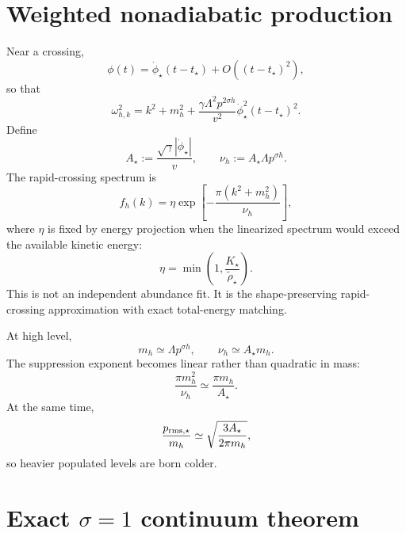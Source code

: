\section{Weighted nonadiabatic production}

Near a crossing,
\begin{equation}
 \phi(t)=\dot\phi_\star(t-t_\star)+O((t-t_\star)^2),
 \label{eq:scw-crossing-linearization}
\end{equation}
so that
\begin{equation}
 \omega_{h,k}^2
 =k^2+m_h^2
 +\frac{\gamma\Lambda^2p^{2\sigma h}}{v^2}
 \dot\phi_\star^2(t-t_\star)^2.
 \label{eq:scw-crossing-frequency}
\end{equation}
Define
\begin{equation}
 A_\star:=\frac{\sqrt\gamma|\dot\phi_\star|}{v},
 \qquad
 \nu_h:=A_\star\Lambda p^{\sigma h}.
 \label{eq:scw-weighted-rate}
\end{equation}
The rapid-crossing spectrum is
\begin{equation}
 \boxed{
 f_h(k)
 =\eta
 \exp\left[-\frac{\pi(k^2+m_h^2)}{\nu_h}\right],}
 \label{eq:scw-weighted-occupation}
\end{equation}
where $\eta$ is fixed by energy projection when the linearized spectrum would exceed the available kinetic energy:
\begin{equation}
 \eta
 =\min\left(1,\frac{K_\star}{\widetilde\rho_\star}\right).
 \label{eq:scw-energy-projection}
\end{equation}
This is not an independent abundance fit.  It is the shape-preserving rapid-crossing approximation with exact total-energy matching.

At high level,
\begin{equation}
 m_h\simeq\Lambda p^{\sigma h},
 \qquad
 \nu_h\simeq A_\star m_h.
 \label{eq:scw-high-level-law}
\end{equation}
The suppression exponent becomes linear rather than quadratic in mass:
\begin{equation}
 \frac{\pi m_h^2}{\nu_h}
 \simeq\frac{\pi m_h}{A_\star}.
 \label{eq:scw-linear-mass-suppression}
\end{equation}
At the same time,
\begin{equation}
 \frac{p_{\rm rms,\star}}{m_h}
 \simeq
 \sqrt{\frac{3A_\star}{2\pi m_h}},
 \label{eq:scw-heavy-colder}
\end{equation}
so heavier populated levels are born colder.

\section{Exact \texorpdfstring{$\sigma=1$}{sigma=1} continuum theorem}

